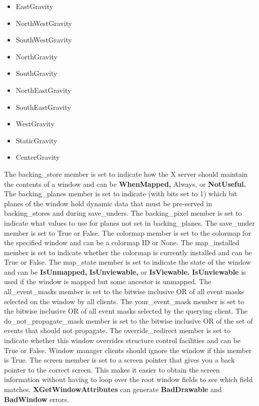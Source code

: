 \documentclass{report}
\begin{document}
\begin{itemize}
\begin{itemize}
                \item EastGravity
                \item NorthWestGravity 
                \item SouthWestGravity
                \item NorthGravity 
                \item SouthGravity
                \item NorthEastGravity 
                \item SouthEastGravity
                \item WestGravity 
                \item StaticGravity
                \item CenterGravity
            \end{itemize}
            The backing\_store member is set to indicate how the X server should maintain the contents of a window and can be \textbf{WhenMapped,} Always, or \textbf{NotUseful.} The backing\_planes member is set to indicate (with bits set to 1) which bit planes of the window hold dynamic data that must be pre-served in backing\_stores and during save\_unders. The backing\_pixel member is set to indicate what values to use for planes not set in backing\_planes.
            \bigbreak \noindent 
            The save\_under member is set to True or False. The colormap member is set to the colormap for the specified window and can be a colormap ID or None. The map\_installed member is set to indicate whether the colormap is currently installed and can be True or False. The map\_state member is set to indicate the state of the window and can be \textbf{IsUnmapped,} \textbf{IsUnviewable,} or \textbf{IsViewable.} \textbf{IsUnviewable} is used if the window is mapped but some ancestor is unmapped.
            \bigbreak \noindent 
            The all\_event\_masks member is set to the bitwise inclusive OR of all event masks selected on the window by all clients. The your\_event\_mask member is set to the bitwise inclusive OR of all event masks selected by the querying client. The do\_not\_propagate\_mask member is set to the bitwise inclusive OR of the set of events that should not propagate.
            \bigbreak \noindent 
            The override\_redirect member is set to indicate whether this window overrides structure control facilities and can be True or False. Window manager clients should ignore the window if this member is True.
            \bigbreak \noindent 
            The screen member is set to a screen pointer that gives you a back pointer to the correct screen. This makes it easier to obtain the screen information without having to loop over the root window fields to see which field matches. \textbf{XGetWindowAttributes} can generate \textbf{BadDrawable} and \textbf{BadWindow} errors.

\end{itemize}
\end{document}
